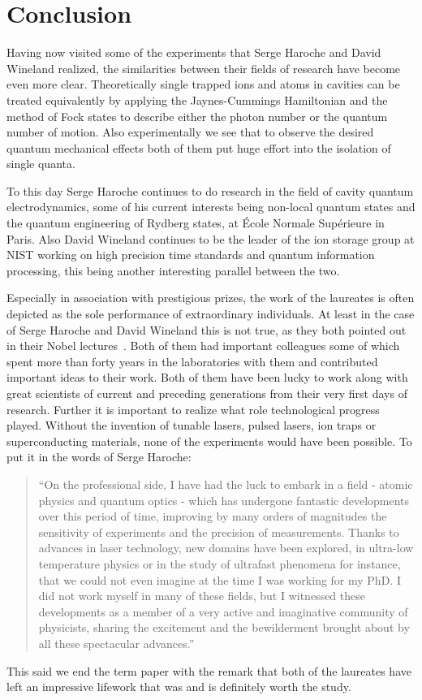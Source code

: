 \section{Conclusion}
\label{sec:Conclusion}
Having now visited some of the experiments that Serge Haroche and David Wineland
realized, the similarities between their fields of research have become even more
clear. Theoretically single trapped  ions and atoms in cavities can be 
treated equivalently by applying the Jaynes-Cummings Hamiltonian and the method of Fock states
to describe either the photon number or the quantum number of motion. Also
experimentally we see that to observe the desired quantum mechanical effects both
of them put huge effort into the isolation of single quanta.

To this day Serge Haroche continues to do research in the field of cavity
quantum electrodynamics, some of his current interests being non-local quantum
states and the quantum engineering of Rydberg states, at École Normale
Supérieure in Paris. Also David Wineland continues to be the leader of the ion
storage group at NIST working on high precision time standards and quantum
information processing, this being another interesting parallel between the two.

Especially in association with prestigious prizes, the work of the laureates is
often depicted as the sole performance of extraordinary individuals. At least in
the case of Serge Haroche and David Wineland this is not true, as they both
pointed out in their Nobel lectures~\cite{wineland2012nobel, haroche2012nobel}.
Both of them had important colleagues some of which spent more than forty years
in the laboratories with them and contributed important ideas to their work.
Both of them have been lucky to work along with great scientists of current and preceding
generations from their very first days of research. Further it is important to
realize what role technological progress played. Without the invention of
tunable lasers, pulsed lasers, ion traps or superconducting materials, none of
the experiments would have been possible. To put it in the words of Serge
Haroche:
\begin{quote}
  ``On the professional side, I have had the luck to embark in a field - atomic
  physics and quantum optics - which has undergone  fantastic  developments
  over this period of time, improving by many orders of magnitudes the
  sensitivity of experiments and the precision of measurements. Thanks to
  advances in laser technology, new domains have been explored, in ultra-low
  temperature physics or in the study of ultrafast phenomena for instance, that
  we could not even imagine at the time I was working for my PhD. I did not work
  myself in many of these fields, but I witnessed these developments as a member
  of a very active and imaginative community of physicists, sharing the
  excitement and the bewilderment brought about by all these spectacular
  advances.''~\cite{shbio}
\end{quote}

This said we end the term paper with the remark that both of the laureates have left an
impressive lifework that was and is definitely worth the study.
